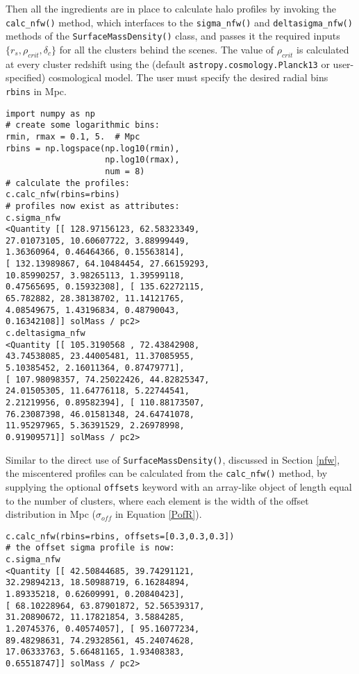 \documentclass[twocolumn]{aastex6}
\newcommand{\code}{\lstinline[style=codeintext]}
\begin{document}
Then all the ingredients are in place to calculate halo profiles by invoking the \code{calc_nfw()} method, which interfaces to the \code{sigma_nfw()} and \code{deltasigma_nfw()} methods of the \code{SurfaceMassDensity()} class, and passes it the required inputs $\{ r_s, \rho_{crit}, \delta_c \}$ for all the clusters behind the scenes. The value of $\rho_{crit}$ is calculated at every cluster redshift using the (default \code{astropy.cosmology.Planck13} or user-specified) cosmological model. The user must specify the desired radial bins \code{rbins} in Mpc.
\begin{lstlisting}
import numpy as np
# create some logarithmic bins:
rmin, rmax = 0.1, 5.  # Mpc
rbins = np.logspace(np.log10(rmin),
                    np.log10(rmax),
                    num = 8)
# calculate the profiles:
c.calc_nfw(rbins=rbins)
# profiles now exist as attributes:
c.sigma_nfw
<Quantity [[ 128.97156123, 62.58323349,
27.01073105, 10.60607722, 3.88999449,
1.36360964, 0.46464366, 0.15563814],
[ 132.13989867, 64.10484454, 27.66159293,
10.85990257, 3.98265113, 1.39599118,
0.47565695, 0.15932308], [ 135.62272115,
65.782882, 28.38138702, 11.14121765,
4.08549675, 1.43196834, 0.48790043,
0.16342108]] solMass / pc2>
c.deltasigma_nfw
<Quantity [[ 105.3190568 , 72.43842908,
43.74538085, 23.44005481, 11.37085955,
5.10385452, 2.16011364, 0.87479771],
[ 107.98098357, 74.25022426, 44.82825347,
24.01505305, 11.64776118, 5.22744541,
2.21219956, 0.89582394], [ 110.88173507,
76.23087398, 46.01581348, 24.64741078,
11.95297965, 5.36391529, 2.26978998,
0.91909571]] solMass / pc2>
\end{lstlisting}

Similar to the direct use of \code{SurfaceMassDensity()}, discussed in Section \ref{nfw}, the miscentered profiles can be calculated from the \code{calc_nfw()} method, by supplying the optional \code{offsets} keyword with an array-like object of length equal to the number of clusters, where each element is the width of the offset distribution in Mpc ($\sigma_{off}$ in Equation \ref{PofR}).
\begin{lstlisting}
c.calc_nfw(rbins=rbins, offsets=[0.3,0.3,0.3])
# the offset sigma profile is now:
c.sigma_nfw
<Quantity [[ 42.50844685, 39.74291121,
32.29894213, 18.50988719, 6.16284894,
1.89335218, 0.62609991, 0.20840423],
[ 68.10228964, 63.87901872, 52.56539317,
31.20890672, 11.17821854, 3.5884285,
1.20745376, 0.40574057], [ 95.16077234,
89.48298631, 74.29328561, 45.24074628,
17.06333763, 5.66481165, 1.93408383,
0.65518747]] solMass / pc2>
\end{lstlisting}
\end{document}
